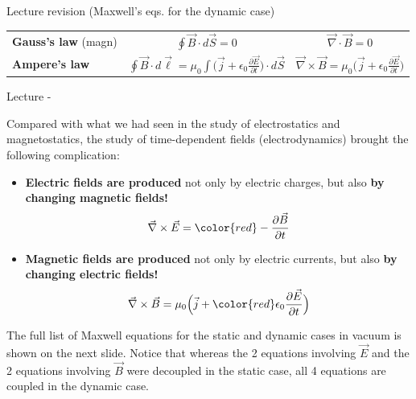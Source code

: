 \begin{frame}{Lecture \summarizedlecture revision (Maxwell's eqs. for the dynamic case)}
{\begin{center}
{\begin{table}[H]
\begin{tabular}{|l|c|c|}
      {\bf Gauss's law} (magn) &
        $\displaystyle  \oint \vec{B} \cdot d\vec{S} = 0$ &
        $\displaystyle  \vec{\nabla} \cdot \vec{B} = 0$ \\

      {\bf Ampere's law} &
        $\displaystyle \oint \vec{B} \cdot d\vec{\ell} =
           \mu_{0} \int \Big( \vec{j} + \epsilon_0 \frac{\partial \vec{E}}{\partial t}\Big) \cdot d\vec{S}$ &
        $\displaystyle \vec{\nabla} \times \vec{B} =
           \mu_{0} \Big( \vec{j} + \epsilon_0 \frac{\partial \vec{E}}{\partial t}\Big)$ \\
      \hline
    \end{tabular}
  \end{table}
}
\end{center}

}
\end{frame}



%
%
%

\begin{frame}{Lecture \summarizedlecture - \lecturesummarytitle}

Compared with what we had seen in the study of electrostatics and magnetostatics,
the study of time-dependent fields (electrodynamics) brought the following complication:\\

\vspace{0.1cm}

\begin{itemize}
   \item {\bf Electric fields are produced} not only by electric charges,
             but also {\bf by changing magnetic fields!}
     \begin{equation*}
        \vec{\nabla} \times \vec{E} = {\color{red} - \frac{\partial \vec{B}}{\partial t}}
     \end{equation*}

   \item {\bf Magnetic fields are produced} not only by electric currents,
             but also {\bf by changing electric fields!}
     \begin{equation*}
         \vec{\nabla} \times \vec{B} = \mu_{0} \Big( \vec{j} + {\color{red} \epsilon_0 \frac{\partial \vec{E}}{\partial t} } \Big)
     \end{equation*}
\end{itemize}

{\small
The full list of Maxwell equations for the static and dynamic cases in vacuum is shown on the next slide.
Notice that whereas the 2 equations involving $\vec{E}$ and the 2 equations involving $\vec{B}$ were decoupled in the static case,
all 4 equations are coupled in the dynamic case.\\
}

\end{frame}



